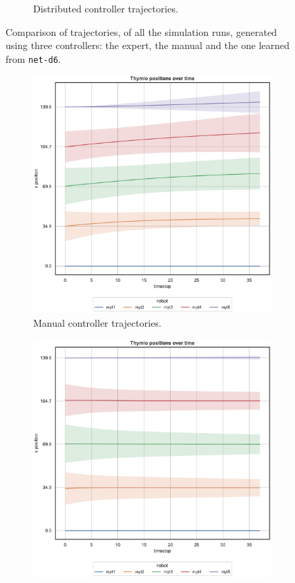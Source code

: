 \begin{figure}[!htb]
\begin{center}
\begin{subfigure}[h]{0.49\textwidth}
			\caption{Distributed controller trajectories.}
		\end{subfigure}
	\end{center}
	\caption[Evaluation of the trajectories learned by \texttt{net-d6}.]{Comparison 
	of trajectories, of all the simulation runs, generated using three controllers: the 
	expert, the manual and the one learned from \texttt{net-d6}.}
\end{figure}
\begin{figure}[!htb]\ContinuedFloat
	\begin{center}
	\begin{subfigure}[h]{0.49\textwidth}
		\centering			
		\includegraphics[width=.9\textwidth]{contents/images/net-d6/position-overtime-manual}%
		\caption{Manual controller trajectories.}
	\end{subfigure}
	\hfill
	\begin{subfigure}[h]{0.49\textwidth}
		\centering
		\includegraphics[width=.9\textwidth]{contents/images/net-d6/position-overtime-learned_distributed}

\end{subfigure}
\end{center}
\end{figure}
